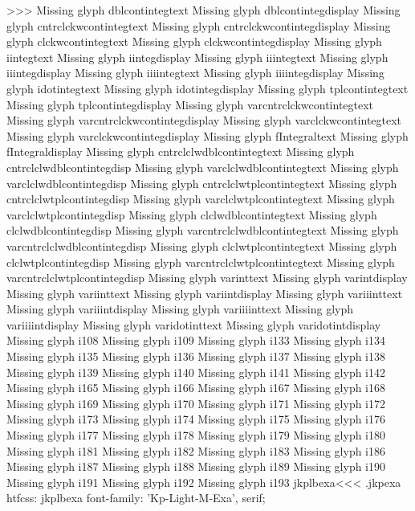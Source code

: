 >>>
Missing glyph	dblcontintegtext
Missing glyph	dblcontintegdisplay
Missing glyph	cntrclckwcontintegtext
Missing glyph	cntrclckwcontintegdisplay
Missing glyph	clckwcontintegtext
Missing glyph	clckwcontintegdisplay
Missing glyph	iintegtext
Missing glyph	iintegdisplay
Missing glyph	iiintegtext
Missing glyph	iiintegdisplay
Missing glyph	iiiintegtext
Missing glyph	iiiintegdisplay
Missing glyph	idotintegtext
Missing glyph	idotintegdisplay
Missing glyph	tplcontintegtext
Missing glyph	tplcontintegdisplay
Missing glyph	varcntrclckwcontintegtext
Missing glyph	varcntrclckwcontintegdisplay
Missing glyph	varclckwcontintegtext
Missing glyph	varclckwcontintegdisplay
Missing glyph	fIntegraltext
Missing glyph	fIntegraldisplay
Missing glyph	cntrclclwdblcontintegtext
Missing glyph	cntrclclwdblcontintegdisp
Missing glyph	varclclwdblcontintegtext
Missing glyph	varclclwdblcontintegdisp
Missing glyph	cntrclclwtplcontintegtext
Missing glyph	cntrclclwtplcontintegdisp
Missing glyph	varclclwtplcontintegtext
Missing glyph	varclclwtplcontintegdisp
Missing glyph	clclwdblcontintegtext
Missing glyph	clclwdblcontintegdisp
Missing glyph	varcntrclclwdblcontintegtext
Missing glyph	varcntrclclwdblcontintegdisp
Missing glyph	clclwtplcontintegtext
Missing glyph	clclwtplcontintegdisp
Missing glyph	varcntrclclwtplcontintegtext
Missing glyph	varcntrclclwtplcontintegdisp
Missing glyph	varinttext
Missing glyph	varintdisplay
Missing glyph	variinttext
Missing glyph	variintdisplay
Missing glyph	variiinttext
Missing glyph	variiintdisplay
Missing glyph	variiiinttext
Missing glyph	variiiintdisplay
Missing glyph	varidotinttext
Missing glyph	varidotintdisplay
Missing glyph	i108
Missing glyph	i109
Missing glyph	i133
Missing glyph	i134
Missing glyph	i135
Missing glyph	i136
Missing glyph	i137
Missing glyph	i138
Missing glyph	i139
Missing glyph	i140
Missing glyph	i141
Missing glyph	i142
Missing glyph	i165
Missing glyph	i166
Missing glyph	i167
Missing glyph	i168
Missing glyph	i169
Missing glyph	i170
Missing glyph	i171
Missing glyph	i172
Missing glyph	i173
Missing glyph	i174
Missing glyph	i175
Missing glyph	i176
Missing glyph	i177
Missing glyph	i178
Missing glyph	i179
Missing glyph	i180
Missing glyph	i181
Missing glyph	i182
Missing glyph	i183
Missing glyph	i186
Missing glyph	i187
Missing glyph	i188
Missing glyph	i189
Missing glyph	i190
Missing glyph	i191
Missing glyph	i192
Missing glyph	i193
\<jkplbexa\><<<
.jkpexa
htfcss:  jkplbexa  font-family: 'Kp-Light-M-Exa', serif;

